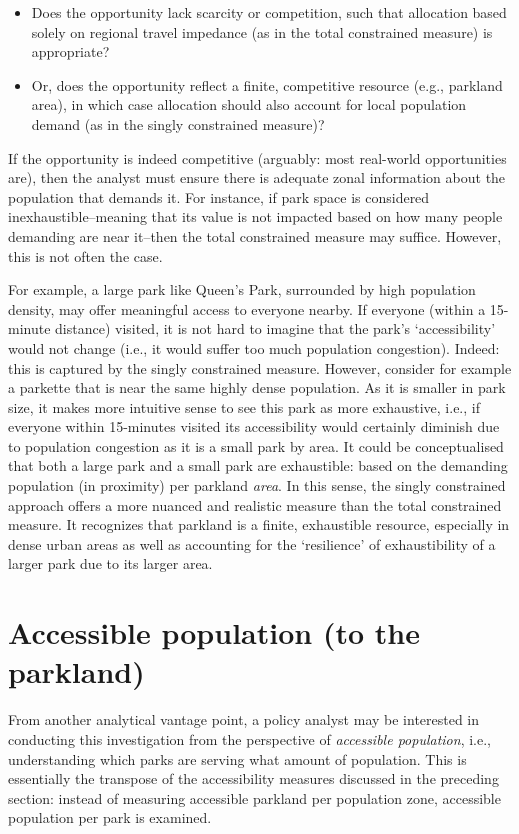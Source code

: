 \documentclass[
11pt, %
oneside, %
english, %
singlespacing, %
]{macthesis} %
\def\tightlist{}
\begin{document}
\begin{itemize}
\tightlist
\item
  Does the opportunity lack scarcity or competition, such that allocation based solely on regional travel impedance (as in the total constrained measure) is appropriate?
\item
  Or, does the opportunity reflect a finite, competitive resource (e.g., parkland area), in which case allocation should also account for local population demand (as in the singly constrained measure)?
\end{itemize}

If the opportunity is indeed competitive (arguably: most real-world opportunities are), then the analyst must ensure there is adequate zonal information about the population that demands it. For instance, if park space is considered inexhaustible--meaning that its value is not impacted based on how many people demanding are near it--then the total constrained measure may suffice. However, this is not often the case.

For example, a large park like Queen's Park, surrounded by high population density, may offer meaningful access to everyone nearby. If everyone (within a 15-minute distance) visited, it is not hard to imagine that the park's `accessibility' would not change (i.e., it would suffer too much population congestion). Indeed: this is captured by the singly constrained measure. However, consider for example a parkette that is near the same highly dense population. As it is smaller in park size, it makes more intuitive sense to see this park as more exhaustive, i.e., if everyone within 15-minutes visited its accessibility would certainly diminish due to population congestion as it is a small park by area. It could be conceptualised that both a large park and a small park are exhaustible: based on the demanding population (in proximity) per parkland \emph{area}. In this sense, the singly constrained approach offers a more nuanced and realistic measure than the total constrained measure. It recognizes that parkland is a finite, exhaustible resource, especially in dense urban areas as well as accounting for the `resilience' of exhaustibility of a larger park due to its larger area.

\section{Accessible population (to the parkland)}\label{sec:accessible-pop}

From another analytical vantage point, a policy analyst may be interested in conducting this investigation from the perspective of \emph{accessible population}, i.e., understanding which parks are serving what amount of population. This is essentially the transpose of the accessibility measures discussed in the preceding section: instead of measuring accessible parkland per population zone, accessible population per park is examined.
\end{document}
